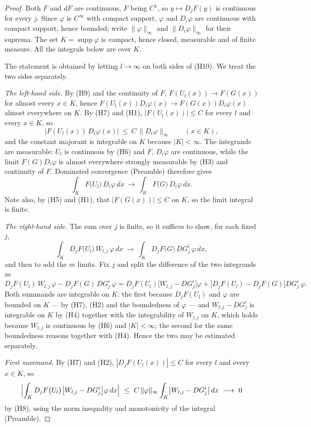 \begin{proof}
Both $F$ and $dF$ are continuous, $F$ being $C^1$, so $y\mapsto D_jF(y)$ is
continuous for every $j$.  Since $\varphi$ is $C^\infty$ with compact support,
$\varphi$ and $D_i\varphi$ are continuous with compact support, hence bounded;
write $\|\varphi\|_\infty$ and $\|D_i\varphi\|_\infty$ for their suprema.  The
set $K=\operatorname{supp}\varphi$ is compact, hence closed, measurable and of
finite measure.  All the integrals below are over $K$.

The statement is obtained by letting $l\to\infty$ on both sides of (H10).  We
treat the two sides separately.

\emph{The left-hand side.}  By (H9) and the continuity of $F$,
$F(U_l(x))\to F(G(x))$ for almost every $x\in K$, hence
$F(U_l(x))D_i\varphi(x)\to F(G(x))D_i\varphi(x)$ almost everywhere on $K$.  By
(H7) and (H1), $|F(U_l(x))|\le C$ for every $l$ and every $x\in K$, so
\[
\bigl|F(U_l(x))\,D_i\varphi(x)\bigr|\ \le\ C\,\|D_i\varphi\|_\infty
\qquad(x\in K),
\]
and the constant majorant is integrable on $K$ because $|K|<\infty$.  The
integrands are measurable: $U_l$ is continuous by (H6) and $F$, $D_i\varphi$
are continuous, while the limit $F(G)D_i\varphi$ is almost everywhere strongly
measurable by (H3) and continuity of $F$.  Dominated convergence (Preamble)
therefore gives
\[
\int_K F\bigl(U_l\bigr)\,D_i\varphi\,dx\ \longrightarrow\
\int_K F\bigl(G\bigr)\,D_i\varphi\,dx .
\tag{1}
\]
Note also, by (H5) and (H1), that $|F(G(x))|\le C$ on $K$, so the limit
integral is finite.

\emph{The right-hand side.}  The sum over $j$ is finite, so it suffices to show,
for each fixed $j$,
\[
\int_K D_jF\bigl(U_l\bigr)\,W_{l,j}\,\varphi\,dx\ \longrightarrow\
\int_K D_jF\bigl(G\bigr)\,DG^i_j\,\varphi\,dx ,
\tag{2}
\]
and then to add the $m$ limits.  Fix $j$ and split the difference of the two
integrands as
\[
D_jF(U_l)\,W_{l,j}\,\varphi-D_jF(G)\,DG^i_j\,\varphi
=D_jF(U_l)\bigl[W_{l,j}-DG^i_j\bigr]\varphi
+\bigl[D_jF(U_l)-D_jF(G)\bigr]DG^i_j\,\varphi .
\]
Both summands are integrable on $K$: the first because $D_jF(U_l)$ and
$\varphi$ are bounded on $K$ --- by (H7), (H2) and the boundedness of $\varphi$
--- and $W_{l,j}-DG^i_j$ is integrable on $K$ by (H4) together with the
integrability of $W_{l,j}$ on $K$, which holds because $W_{l,j}$ is continuous
by (H6) and $|K|<\infty$; the second for the same boundedness reasons together
with (H4).  Hence the two may be estimated separately.

\emph{First summand.}  By (H7) and (H2), $|D_jF(U_l(x))|\le C$ for every $l$
and every $x\in K$, so
\[
\Bigl|\int_K D_jF\bigl(U_l\bigr)\bigl[W_{l,j}-DG^i_j\bigr]\varphi\,dx\Bigr|
\ \le\ C\,\|\varphi\|_\infty\int_K\bigl|W_{l,j}-DG^i_j\bigr|\,dx
\ \longrightarrow\ 0
\]
by (H8), using the norm inequality and monotonicity of the integral (Preamble).


\end{proof}

